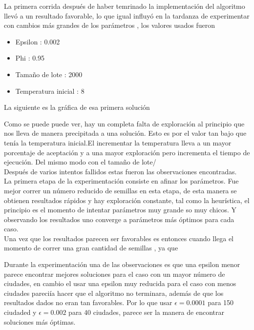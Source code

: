 \documentclass[a4paper]{article}
\begin{document}
La primera corrida despu\'es de haber temrinado la implementaci\'on del algoritmo llev\'o a un resultado favorable, lo que igual influy\'o en la tardanza de experimentar con cambios m\'as grandes de los par\'ametros , los valores usados fueron
\begin{itemize}
\item Epsilon : 0.002
\item Phi : 0.95
\item Tamaño de lote : 2000
\item Temperatura inicial : 8
\end{itemize}
La siguiente es la gr\'afica de esa primera soluci\'on



Como se puede puede ver, hay un completa falta de exploraci\'on al principio que nos lleva de manera precipitada a una soluci\'on. Esto es por el valor tan bajo que ten\'ia la temperatura inicial.El incrementar la temperatura lleva a un mayor porcentaje de aceptaci\'on y a una mayor exploraci\'on pero incrementa el tiempo de ejecuci\'on. Del mismo modo con el tamaño de lote/\\

Despu\'es de varios intentos fallidos estas fueron las observaciones encontradas.\\

La primera etapa de la experimentaci\'on consiste en afinar los par\'ametros. Fue mejor correr un n\'umero reducido de semillas en esta etapa, de esta manera se obtienen resultados r\'apidos y hay exploraci\'on constante, tal como la heur\'istica, el principio es el momento de intentar par\'ametros muy grande so muy chicos. Y observando los resultados uno converge a par\'ametros m\'as \'optimos para cada caso. \\


Una vez que los resultados parecen ser favorables es entonces cuando llega el momento de correr una gran cantidad de semillas , ya que 

Durante la experimentaci\'on una de las observaciones es que una epsilon menor parece encontrar mejores soluciones para el caso con un mayor n\'umero de ciudades, en cambio el usar una epsilon muy reducida para el caso con menos ciudades pareci\'ia hacer que el algoritmo no terminara, adem\'as de que los resultados dados no eran tan favorables. Por lo que usar $\epsilon = 0.0001$ para 150 ciudaded y $\epsilon = 0.002$ para 40 ciudades, parece ser la manera de encontrar soluciones m\'as \'optimas. \\
\end{document}
